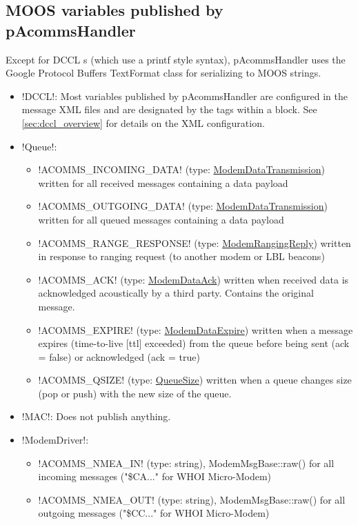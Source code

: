 \subsection{MOOS variables published by pAcommsHandler}

Except for DCCL s (which use a printf style syntax), pAcommsHandler uses the Google Protocol Buffers TextFormat class for serializing to MOOS strings. 

\begin{itemize}
\item !DCCL!: Most variables published by pAcommsHandler are configured in the message XML files and are designated by the tags  within a  block. See \ref{sec:dccl_overview} for details on the XML configuration. 
\item !Queue!:
\begin{itemize}
\item !ACOMMS_INCOMING_DATA! (type: \href{http://gobysoft.com/doc/1.0/modem__message_8proto_source.html}{ModemDataTransmission}) written for all received messages containing a data payload
\item !ACOMMS_OUTGOING_DATA! (type: \href{http://gobysoft.com/doc/1.0/modem__message_8proto_source.html}{ModemDataTransmission}) written for all queued messages containing a data payload
\item !ACOMMS_RANGE_RESPONSE! (type: \href{http://gobysoft.com/doc/1.0/modem__message_8proto_source.html}{ModemRangingReply}) written in response to ranging request (to another modem or LBL beacons)
\item !ACOMMS_ACK! (type: \href{http://gobysoft.com/doc/1.0/modem__message_8proto_source.html}{ModemDataAck}) written when received data is acknowledged acoustically by a third party. Contains the original message.
\item !ACOMMS_EXPIRE! (type: \href{http://gobysoft.com/doc/1.0/modem__message_8proto_source.html}{ModemDataExpire}) written when a message expires (time-to-live [ttl] exceeded) from the queue before being sent (ack = false) or acknowledged (ack = true)
\item !ACOMMS_QSIZE! (type: \href{http://gobysoft.com/doc/1.0/queue_8proto_source.html}{QueueSize}) written when a queue changes size (pop or push) with the new size of the queue.
\end{itemize}
\item !MAC!: Does not publish anything.
\item !ModemDriver!: 
\begin{itemize}
\item !ACOMMS_NMEA_IN! (type: string), ModemMsgBase::raw() for all incoming messages ("\$CA..." for WHOI Micro-Modem)
\item !ACOMMS_NMEA_OUT! (type: string), ModemMsgBase::raw() for all outgoing messages ("\$CC..." for WHOI Micro-Modem)
\end{itemize}
\end{itemize}


